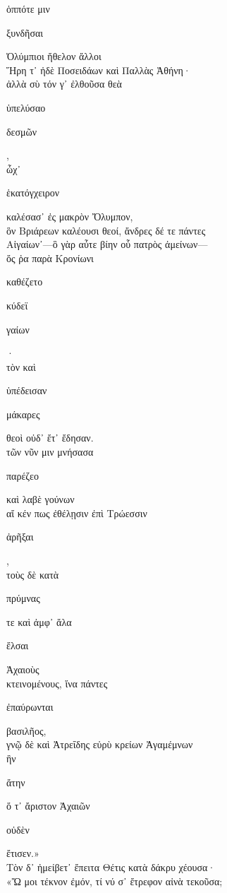 \documentclass{ransom}
\begin{document}
\renewcommand{\rightheaderwhat}{\rightheaderwhatglosses}%
\begin{foreignpage}
\begin{graytext}
ὁππότε μιν \begin{whitetext}ξυνδῆσαι\end{whitetext} Ὀλύμπιοι ἤθελον ἄλλοι\\
Ἥρη τ᾽ ἠδὲ Ποσειδάων καὶ Παλλὰς Ἀθήνη·\hfill{}\\
ἀλλὰ σὺ τόν γ᾽ ἐλθοῦσα θεὰ \begin{whitetext}ὑπελύσαο\end{whitetext} \begin{whitetext}δεσμῶν\end{whitetext},\\
ὦχ᾽ \begin{whitetext}ἑκατόγχειρον\end{whitetext} καλέσασ᾽ ἐς μακρὸν Ὄλυμπον,\\
ὃν Βριάρεων καλέουσι θεοί, ἄνδρες δέ τε πάντες\\
Αἰγαίων᾽—ὃ γὰρ αὖτε βίην οὗ πατρὸς ἀμείνων—\\
ὅς ῥα παρὰ Κρονίωνι \begin{whitetext}καθέζετο\end{whitetext} κύδεϊ \begin{whitetext}γαίων\end{whitetext}·\hfill{}\\
τὸν καὶ \begin{whitetext}ὑπέδεισαν\end{whitetext} \begin{whitetext}μάκαρες\end{whitetext} θεοὶ οὐδ᾽ ἔτ᾽ ἔδησαν.\\
τῶν νῦν μιν μνήσασα \begin{whitetext}παρέζεο\end{whitetext} καὶ λαβὲ γούνων\\
αἴ κέν πως ἐθέλῃσιν ἐπὶ Τρώεσσιν \begin{whitetext}ἀρῆξαι\end{whitetext},\\
τοὺς δὲ κατὰ \begin{whitetext}πρύμνας\end{whitetext} τε καὶ ἀμφ᾽ ἅλα \begin{whitetext}ἔλσαι\end{whitetext} Ἀχαιοὺς\\
κτεινομένους, ἵνα πάντες \begin{whitetext}ἐπαύρωνται\end{whitetext} βασιλῆος,\hfill{}\\
γνῷ δὲ καὶ Ἀτρεΐδης εὐρὺ κρείων Ἀγαμέμνων\\
ἣν \begin{whitetext}ἄτην\end{whitetext} ὅ τ᾽ ἄριστον Ἀχαιῶν \begin{whitetext}οὐδὲν\end{whitetext} ἔτισεν.»\\
Τὸν δ᾽ ἠμείβετ᾽ ἔπειτα Θέτις κατὰ δάκρυ χέουσα·\\
«Ὤ μοι τέκνον ἐμόν, τί νύ σ᾽ ἔτρεφον αἰνὰ τεκοῦσα;\\


\end{graytext}
\end{foreignpage}
\end{document}
